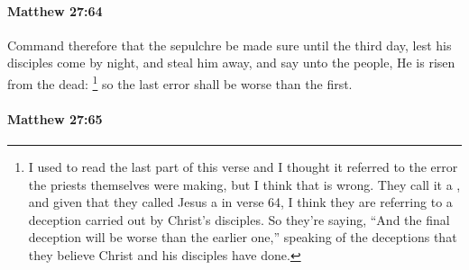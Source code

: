 		\paragraph{Matthew 27:64} %
			\label{MATTHEW-27-64}

			Command therefore that the sepulchre be made sure until the third day, lest his disciples come by night, and steal him away, and say unto the people, He is risen from the dead:
				\footnote{%
					I used to read the last part of this verse and I thought it referred to the error the priests themselves were making, but I think that is wrong. They call it a , and given that they called Jesus a  in verse 64, I think they are referring to a deception carried out by Christ's disciples. So they're saying, ``And the final deception will be worse than the earlier one,'' speaking of the deceptions that they believe Christ and his disciples have done.
					}%
			so the last error shall be worse than the first.

			\begin{framed}
			\scriptsize
				\begin{compactdesc}
					\item[SBLG] 
				\end{compactdesc}
			\end{framed}

		\paragraph{Matthew 27:65} %
			\label{MATTHEW-27-65}

